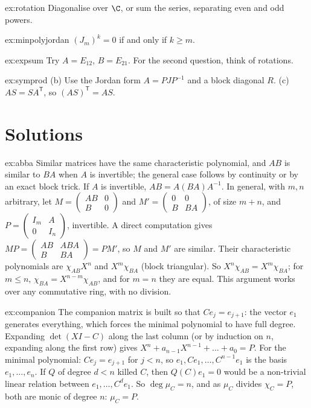\begin{hint}{ex:rotation}
Diagonalise over $\C$, or sum the series, separating even and odd powers.
\end{hint}
\begin{hint}{ex:minpolyjordan}
$(J_m)^{k}=0$ if and only if $k\ge m$.
\end{hint}
\begin{hint}{ex:expsum}
Try $A=E_{12}$, $B=E_{21}$. For the second question, think of rotations.
\end{hint}
\begin{hint}{ex:symprod}
(b) Use the Jordan form $A=PJP^{-1}$ and a block diagonal $R$. (c) $AS=SA^{\mathsf T}$, so $(AS)^{\mathsf T}=AS$.
\end{hint}

\section{Solutions}

\begin{solution}{ex:abba}
\idea Similar matrices have the same characteristic polynomial, and $AB$ is similar to $BA$ when $A$ is invertible; the
general case follows by continuity or by an exact block trick.
\writeup If $A$ is invertible, $AB=A(BA)A^{-1}$. In general, with $m,n$ arbitrary, let $M=\begin{pmatrix}AB&0\\B&0\end{pmatrix}$ and
$M'=\begin{pmatrix}0&0\\B&BA\end{pmatrix}$, of size $m+n$, and $P=\begin{pmatrix}I_m&A\\0&I_n\end{pmatrix}$, invertible. A direct computation gives
$MP=\begin{pmatrix}AB&ABA\\B&BA\end{pmatrix}=PM'$, so $M$ and $M'$ are similar. Their characteristic polynomials are
$\chi_{AB}X^n$ and $X^m\chi_{BA}$ (block triangular). So $X^n\chi_{AB}=X^m\chi_{BA}$; for $m\le n$, $\chi_{BA}=X^{n-m}\chi_{AB}$, and for
$m=n$ they are equal. This argument works over any commutative ring, with no division.
\end{solution}

\begin{solution}{ex:companion}
\idea The companion matrix is built so that $Ce_j=e_{j+1}$: the vector $e_1$ generates everything, which forces the
minimal polynomial to have full degree.
\writeup Expanding $\det(XI-C)$ along the last column (or by induction on $n$, expanding along the first row) gives
$X^n+a_{n-1}X^{n-1}+\dots+a_0=P$. For the minimal polynomial: $Ce_j=e_{j+1}$ for $j<n$, so $e_1,Ce_1,\dots,C^{n-1}e_1$ is the basis
$e_1,\dots,e_n$. If $Q$ of degree $d<n$ killed $C$, then $Q(C)e_1=0$ would be a non-trivial linear relation between
$e_1,\dots,C^de_1$. So $\deg\mu_C=n$, and as $\mu_C$ divides $\chi_C=P$, both are monic of degree $n$: $\mu_C=P$.
\end{solution}

